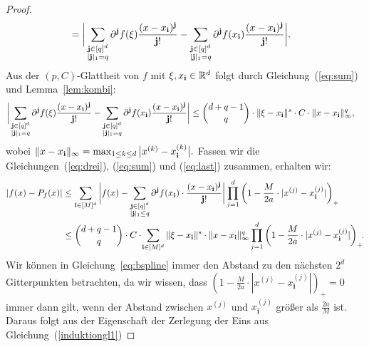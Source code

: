 \begin{proof}
\begin{equation}
\begin{split}
& = \bigg| \sum_{\substack{ \mathbf{j} \in [q]^d \\|\mathbf{j}|_1 = q}} \partial^{\mathbf{j}}f(\xi) \frac{ (x - x_{\mathbf{i}})^{\mathbf{j}} }{\mathbf{j}!} - \sum_{\substack{ \mathbf{j} \in [q]^d \\|\mathbf{j}|_1 = q}} \partial^{\mathbf{j}}f(x_{\mathbf{i}}) \frac{ (x - x_{\mathbf{i}})^{\mathbf{j}} }{\mathbf{j}!}\bigg|.
\end{split}
\end{equation}
Aus der $(p,C)$-Glattheit von $f$ mit $\xi, x_{\mathbf{i}} \in \mathbb{R}^d$ folgt durch Gleichung~(\ref{eq:sum}) und Lemma~\ref{lem:kombi}:
\begin{equation}
\label{eq:last}
\begin{split}
& \bigg| \sum_{\substack{ \mathbf{j} \in [q]^d \\|\mathbf{j}|_1 = q}} \partial^{\mathbf{j}}f(\xi) \frac{ (x - x_{\mathbf{i}})^{\mathbf{j}} }{\mathbf{j}!} - \sum_{\substack{ \mathbf{j} \in [q]^d \\|\mathbf{j}|_1 = q}} \partial^{\mathbf{j}}f(x_{\mathbf{i}}) \frac{ (x - x_{\mathbf{i}})^{\mathbf{j}} }{\mathbf{j}!}\bigg| \leq \binom{d + q - 1}{q} \cdot \|\xi - x_{\mathbf{i}} \|^s \cdot C \cdot \|x - x_{\mathbf{i}}\|_{\infty}^q,
\end{split}
\end{equation}
wobei $\|x - x_{\mathbf{i}}\|_{\infty} = \max_{1 \leq k \leq d}\big|x^{(k)} - x_{\mathbf{i}}^{(k)}\big|.$
Fassen wir die Gleichungen~(\ref{eq:drei}), (\ref{eq:sum}) und (\ref{eq:last}) zusammen, erhalten wir:
\begin{equation}
\label{last}
\begin{split}
|f(x) - P_f(x)| & \leq \sum_{\mathbf{i} \in [M]^d} \bigg|f(x) - \sum_{\substack{\mathbf{j} \in [q]^d \\|\mathbf{j}|_1 \leq q}} \partial^{\mathbf{j}}f(x_{\mathbf{i}}) \cdot \frac{(x - x_{\mathbf{i}})^{\mathbf{j}}}{\mathbf{j}!}\bigg| \prod_{j = 1}^d \bigg(1 - \frac{M}{2a} \cdot |x^{(j)} - x_{\mathbf{i}}^{(j)}|\bigg)_+ \\
& \leq \binom{d + q - 1}{q} \cdot C \cdot \!\sum_{\mathbf{i} \in [M]^d} \|\xi - x_{\mathbf{i}} \|^s \cdot \|x - x_{\mathbf{i}}\|_{\infty}^q \prod_{j = 1}^d \bigg(1 - \frac{M}{2a} \cdot |x^{(j)} - x_{\mathbf{i}}^{(j)}|\bigg)_+\!.
\end{split}
\end{equation}
Wir können in Gleichung~\eqref{eq:bspline} immer den Abstand zu den nächsten $2^d$ Gitterpunkten betrachten, da wir wissen, dass $(1 - \frac{M}{2a} \cdot |x^{(j)} - x_{\mathbf{i}}^{(j)}|)_+ = 0$ immer dann gilt, wenn der Abstand zwischen $x^{(j)}$ und $x_{\mathbf{i}}^{(j)}$ größer als $\frac{2a}{M}$ ist. Daraus folgt aus der Eigenschaft der Zerlegung der Eins aus Gleichung~(\ref{induktiongl1})

\end{proof}
